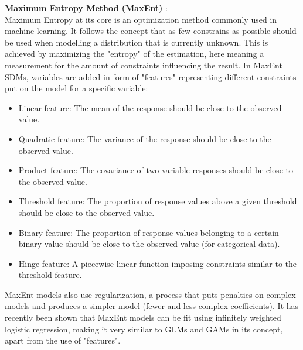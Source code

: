 \documentclass[12pt,a4paper]{article}
\begin{document}
\textbf{Maximum Entropy Method (MaxEnt)} \cite{phillips2006maxent, phillips2017maxnet}:\\
Maximum Entropy at its core is an optimization method commonly used in machine learning.
It follows the concept that as few constrains as possible should be used when modelling a distribution that is currently unknown.
This is achieved by maximizing the "entropy" of the estimation, here meaning a measurement for the amount of constraints influencing the result.
In MaxEnt SDMs, variables are added in form of "features" representing different constraints put on the model for a specific variable:
\begin{itemize}
    \item Linear feature: The mean of the response should be close to the observed value.
    \item Quadratic feature: The variance of the response should be close to the observed value.
    \item Product feature: The covariance of two variable responses should be close to the observed value.
    \item Threshold feature: The proportion of response values above a given threshold should be close to the observed value.
    \item Binary feature: The proportion of response values belonging to a certain binary value should be close to the observed value (for categorical data).
    \item Hinge feature: A piecewise linear function imposing constraints similar to the threshold feature.
\end{itemize}

MaxEnt models also use regularization, a process that puts penalties on complex models and produces a simpler model (fewer and less complex coefficients).
It has recently been shown that MaxEnt models can be fit using infinitely weighted logistic regression, making it very similar to GLMs and GAMs in its concept, apart from the use of "features".
\end{document}
